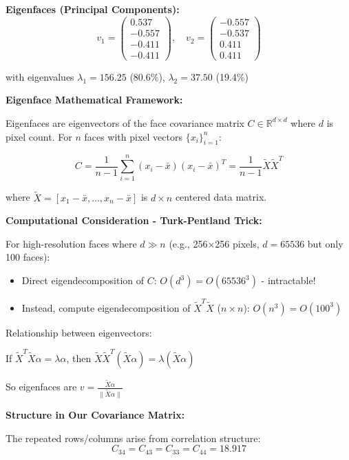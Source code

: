 \documentclass[12pt]{article}
\begin{document}
\begin{solution}
\textbf{Eigenfaces (Principal Components):}
\[
\boxed{
v_1 = \begin{pmatrix}
0.537 \\
-0.557 \\
-0.411 \\
-0.411
\end{pmatrix}, \quad
v_2 = \begin{pmatrix}
-0.557 \\
-0.537 \\
0.411 \\
0.411
\end{pmatrix}
}
\]

with eigenvalues $\lambda_1 = 156.25$ (80.6\%), $\lambda_2 = 37.50$ (19.4\%)

\end{solution}

\begin{explanation}

\textbf{Eigenface Mathematical Framework:}

Eigenfaces are eigenvectors of the face covariance matrix $C \in \mathbb{R}^{d \times d}$ where $d$ is pixel count. For $n$ faces with pixel vectors $\{x_i\}_{i=1}^n$:

\[
C = \frac{1}{n-1}\sum_{i=1}^n (x_i - \bar{x})(x_i - \bar{x})^T = \frac{1}{n-1}\tilde{X}\tilde{X}^T
\]

where $\tilde{X} = [x_1 - \bar{x}, \ldots, x_n - \bar{x}]$ is $d \times n$ centered data matrix.

\textbf{Computational Consideration - Turk-Pentland Trick:}

For high-resolution faces where $d \gg n$ (e.g., 256×256 pixels, $d = 65536$ but only 100 faces):
\begin{itemize}
    \item Direct eigendecomposition of $C$: $O(d^3) = O(65536^3)$ - intractable!
    \item Instead, compute eigendecomposition of $\tilde{X}^T\tilde{X}$ ($n \times n$): $O(n^3) = O(100^3)$
\end{itemize}

Relationship between eigenvectors:

If $\tilde{X}^T\tilde{X} \alpha = \lambda \alpha$, then $\tilde{X}\tilde{X}^T(\tilde{X}\alpha) = \lambda(\tilde{X}\alpha)$

So eigenfaces are $v = \frac{\tilde{X}\alpha}{\|\tilde{X}\alpha\|}$

\textbf{Structure in Our Covariance Matrix:}

The repeated rows/columns arise from correlation structure:
\[
C_{34} = C_{43} = C_{33} = C_{44} = 18.917
\]


\end{explanation}
\end{document}
